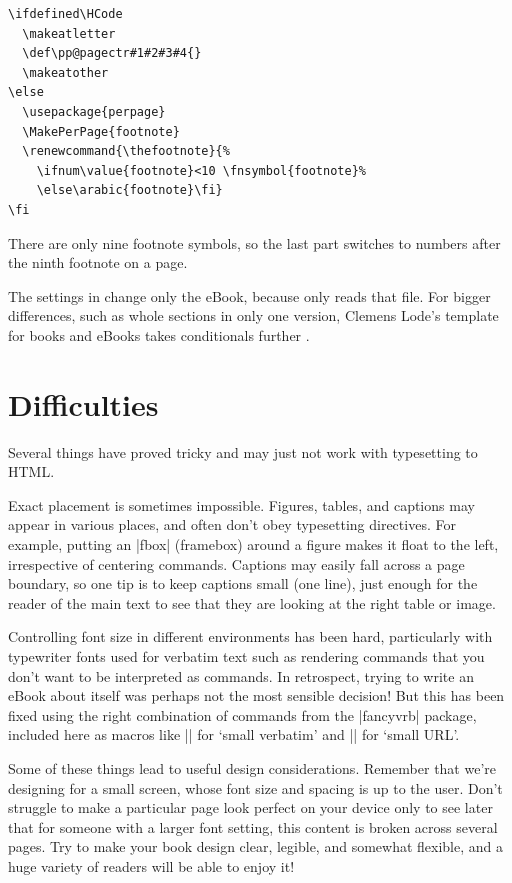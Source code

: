 \begin{Verbatim}[fontsize=\small]
\ifdefined\HCode
  \makeatletter
  \def\pp@pagectr#1#2#3#4{}
  \makeatother
\else
  \usepackage{perpage}
  \MakePerPage{footnote}
  \renewcommand{\thefootnote}{%
    \ifnum\value{footnote}<10 \fnsymbol{footnote}%
    \else\arabic{footnote}\fi}
\fi
\end{Verbatim}

There are only nine footnote symbols, so the last part switches to numbers after the ninth footnote on a page.

The settings in  change only the eBook, because only  reads that file.
For bigger differences, such as whole sections in only one version, Clemens Lode's template for books and eBooks takes conditionals further \citep{lode2019better}.

\section{Difficulties}

Several things have proved tricky and may just not work with typesetting to HTML.

Exact placement is sometimes impossible. Figures, tables, and captions may appear
in various places, and often don't obey \tex typesetting directives. For example,
putting an \sverb|fbox| (framebox) around a figure makes it float to the left, irrespective of
centering commands. Captions may easily fall across
a page boundary, so one tip is to keep captions small (one line), just enough for the reader
of the main text to see that they are looking at the right table or image.

Controlling font size in different environments has been hard, particularly with typewriter fonts
used for verbatim text such as rendering \latex commands that you don't want to be interpreted as
\latex commands. In retrospect, trying to write an eBook about \latex itself was perhaps not the
most sensible decision! But this has been fixed using the right combination of commands from the
\sverb|fancyvrb| package, included here as macros like \sverb|\sverb| for `small verbatim' and
\sverb|\surl| for `small URL'.

Some of these things lead to useful design considerations.
Remember that we're designing for a small screen, whose font size and spacing is up to the user. 
Don't struggle to make a particular page look perfect on your device
only to see later that for someone with a larger font setting, this content is broken across
several pages. Try to make your book design clear, legible,
and somewhat flexible, and a huge variety of readers will be able to enjoy it!

